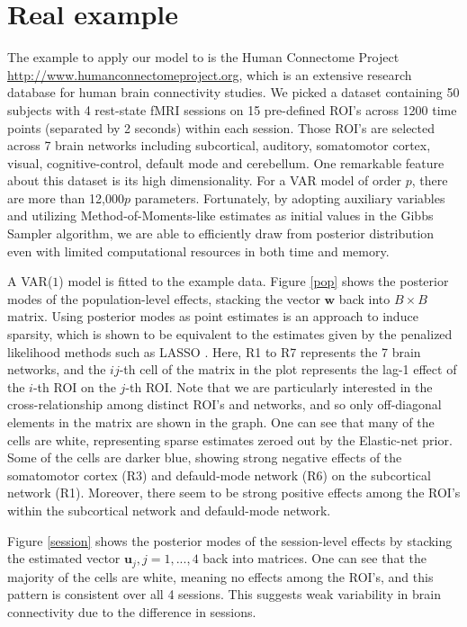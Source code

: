 \documentclass[12pt]{elsarticle}
\begin{document}
		\section{Real example}
		The example to apply our model to is the Human Connectome Project  \url{http://www.humanconnectomeproject.org}, which is an extensive research database for human brain connectivity studies. 
		We picked a dataset containing 50 subjects with 4 rest-state fMRI sessions on 15 pre-defined ROI's across 1200 time points (separated by 2 seconds) within each session. 
		Those ROI's are selected across 7 brain networks including subcortical, auditory, somatomotor cortex, visual, cognitive-control, default mode and cerebellum. 
		One remarkable feature about this dataset is its high dimensionality. 
		For a VAR model of order $p$, there are more than 12,000$p$ parameters.
		Fortunately, by adopting auxiliary variables and utilizing Method-of-Moments-like estimates as initial values in the Gibbs Sampler algorithm, we are able to efficiently draw from posterior distribution even with limited computational resources in both time and memory.
		
		
		A VAR($1$) model is fitted to the example data.
		Figure \ref{pop} shows the posterior modes of the population-level effects, stacking the vector $\boldsymbol{w}$ back into $B \times B$ matrix.
		Using posterior modes as point estimates is an approach to induce sparsity, which is shown to be equivalent to the estimates given by the penalized likelihood methods such as LASSO \cite{Park}. 
		Here, R1 to R7 represents the 7 brain networks, and the $ij$-th cell of the matrix in the plot represents the lag-1 effect of the $i$-th ROI on the $j$-th ROI.
		Note that we are particularly interested in the cross-relationship among distinct ROI's and networks, and so only off-diagonal elements in the matrix are shown in the graph.
		One can see that many of the cells are white, representing sparse estimates zeroed out by the Elastic-net prior.
		Some of the cells are darker blue, showing strong negative effects of the somatomotor cortex (R3) and defauld-mode network (R6) on the subcortical network (R1).
		Moreover, there seem to be strong positive effects among the ROI's within the subcortical network and defauld-mode network.
		
		Figure \ref{session} shows the posterior modes of the session-level effects by stacking the estimated vector $\boldsymbol{u}_j, j=1,...,4$ back into matrices. 
		One can see that the majority of the cells are white, meaning no effects among the ROI's, and this pattern is consistent over all 4 sessions.
		This suggests weak variability in brain connectivity due to the difference in sessions.
		
\end{document}
